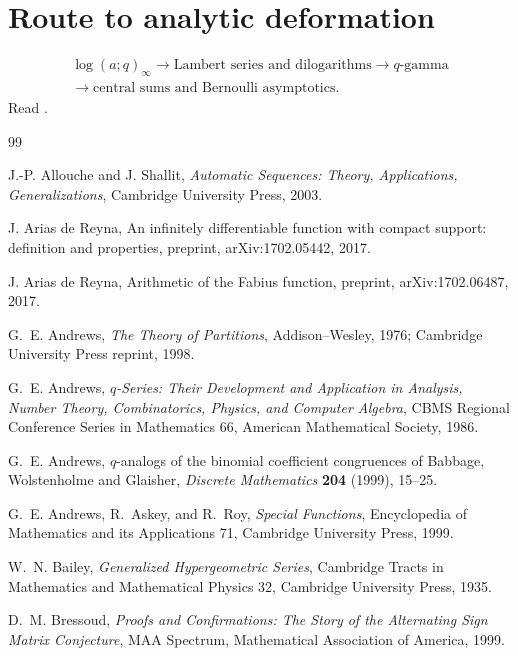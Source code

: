 \documentclass[11pt,oneside,openany]{book}
\theoremstyle{definition}
\theoremstyle{remark}
\begin{document}
\section*{Route to analytic deformation}
\[
\begin{gathered}
 \log(a;q)_\infty
 \longrightarrow \text{Lambert series and dilogarithms}
 \longrightarrow q\text{-gamma}\\
 \longrightarrow \text{central sums and Bernoulli asymptotics}.
\end{gathered}
\]
Read .

\backmatter

\begin{thebibliography}{99}

J.-P. Allouche and J. Shallit,
\emph{Automatic Sequences: Theory, Applications, Generalizations},
Cambridge University Press, 2003.

J. Arias de Reyna,
An infinitely differentiable function with compact support: definition and properties,
preprint, arXiv:1702.05442, 2017.

J. Arias de Reyna,
Arithmetic of the Fabius function,
preprint, arXiv:1702.06487, 2017.

G.~E. Andrews,
\emph{The Theory of Partitions},
Addison--Wesley, 1976; Cambridge University Press reprint, 1998.

G.~E. Andrews,
\emph{$q$-Series: Their Development and Application in Analysis, Number Theory, Combinatorics, Physics, and Computer Algebra},
CBMS Regional Conference Series in Mathematics 66, American Mathematical Society, 1986.

G.~E. Andrews,
$q$-analogs of the binomial coefficient congruences of Babbage, Wolstenholme and Glaisher,
\emph{Discrete Mathematics} \textbf{204} (1999), 15--25.

G.~E. Andrews, R.~Askey, and R.~Roy,
\emph{Special Functions},
Encyclopedia of Mathematics and its Applications 71, Cambridge University Press, 1999.

W.~N. Bailey,
\emph{Generalized Hypergeometric Series},
Cambridge Tracts in Mathematics and Mathematical Physics 32, Cambridge University Press, 1935.

D.~M. Bressoud,
\emph{Proofs and Confirmations: The Story of the Alternating Sign Matrix Conjecture},
MAA Spectrum, Mathematical Association of America, 1999.


\end{thebibliography}
\end{document}

